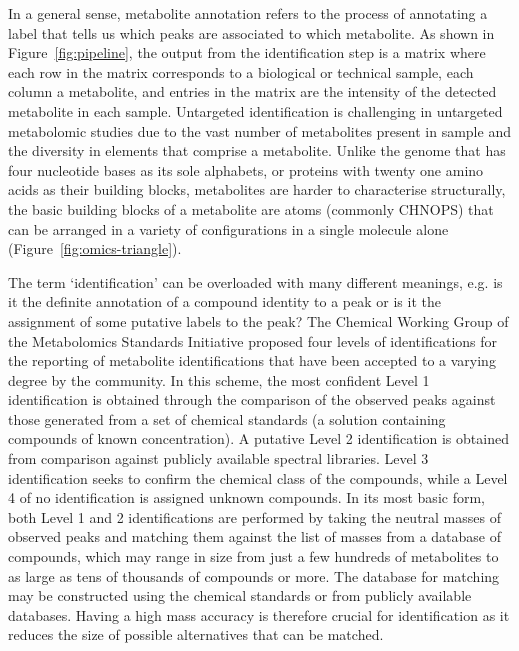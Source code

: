 In a general sense, metabolite annotation refers to the process of annotating a label that tells us which peaks are associated to which metabolite. As shown in Figure~\ref{fig:pipeline}, the output from the identification step is a matrix where each row in the matrix corresponds to a biological or technical sample, each column a metabolite, and entries in the matrix are the intensity of the detected metabolite in each sample. Untargeted identification is challenging in untargeted metabolomic studies due to the vast number of metabolites present in sample and the diversity in elements that comprise a metabolite. Unlike the genome that has four nucleotide bases as its sole alphabets, or proteins with twenty one amino acids as their building blocks, metabolites are harder to characterise structurally, the basic building blocks of a metabolite are atoms (commonly CHNOPS) that can be arranged in a variety of configurations in a single molecule alone (Figure~\ref{fig:omics-triangle}). 

The term `identification' can be overloaded with many different meanings, e.g. is it the definite annotation of a compound identity to a peak or is it the assignment of some putative labels to the peak? The Chemical Working Group of the Metabolomics Standards Initiative proposed four levels of identifications for the reporting of metabolite identifications \cite{Sumner2007} that have been accepted to a varying degree by the community. In this scheme, the most confident Level 1 identification is obtained through the comparison of the observed peaks against those generated from a set of chemical standards (a solution containing compounds of known concentration). A putative Level 2 identification is obtained from comparison against publicly available spectral libraries. Level 3 identification seeks to confirm the chemical class of the compounds, while a Level 4 of no identification is assigned unknown compounds. In its most basic form, both Level 1 and 2 identifications are performed by taking the neutral masses of observed peaks and matching them against the list of masses from a database of compounds, which may range in size from just a few hundreds of metabolites to as large as tens of thousands of compounds or more. The database for matching may be constructed using the chemical standards or from publicly available databases. Having a high mass accuracy is therefore crucial for identification as it reduces the size of possible alternatives that can be matched. 

